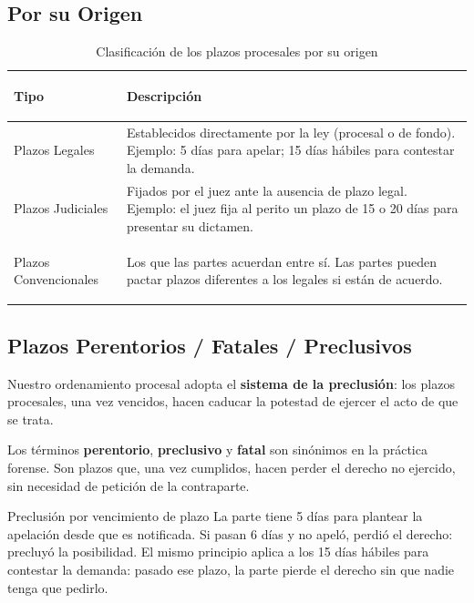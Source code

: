 \documentclass[12pt,oneside]{book}
\begin{document}
\subsection{Por su Origen}

\begin{table}[H]
\centering
\begin{tabularx}{\textwidth}{>{\bfseries\raggedright\arraybackslash}p{} >{\raggedright\arraybackslash}X}
\toprule
\textbf{Tipo} & \textbf{Descripción} \\
\midrule
Plazos Legales & Establecidos directamente por la ley (procesal o de fondo). Ejemplo: 5 días para apelar; 15 días hábiles para contestar la demanda. \\[0.4em]
Plazos Judiciales & Fijados por el juez ante la ausencia de plazo legal. Ejemplo: el juez fija al perito un plazo de 15 o 20 días para presentar su dictamen. \\[0.4em]
Plazos Convencionales & Los que las partes acuerdan entre sí. Las partes pueden pactar plazos diferentes a los legales si están de acuerdo. \\
\bottomrule
\end{tabularx}
\caption{Clasificación de los plazos procesales por su origen}
\end{table}

\subsection{Plazos Perentorios / Fatales / Preclusivos}

Nuestro ordenamiento procesal adopta el \textbf{sistema de la preclusión}: los plazos procesales, una vez vencidos, hacen caducar la potestad de ejercer el acto de que se trata.

\begin{note}
Los términos \textbf{perentorio}, \textbf{preclusivo} y \textbf{fatal} son sinónimos en la práctica forense. Son plazos que, una vez cumplidos, hacen perder el derecho no ejercido, sin necesidad de petición de la contraparte.
\end{note}

\begin{example}{Preclusión por vencimiento de plazo}
La parte tiene 5 días para plantear la apelación desde que es notificada. Si pasan 6 días y no apeló, perdió el derecho: precluyó la posibilidad. El mismo principio aplica a los 15 días hábiles para contestar la demanda: pasado ese plazo, la parte pierde el derecho sin que nadie tenga que pedirlo.
\end{example}
\end{document}
